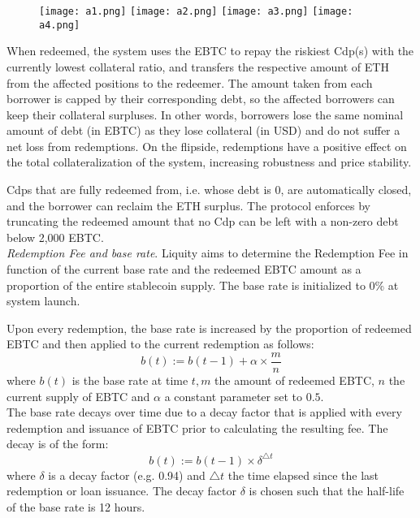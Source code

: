 \documentclass{article}
\begin{document}
\begin{figure}[h]
\centering
\texttt{[image: a1.png]}
\texttt{[image: a2.png]}
\texttt{[image: a3.png]}
\texttt{[image: a4.png]}
\end{figure}

When redeemed, the system uses the EBTC to repay the riskiest Cdp(s) with the currently lowest collateral ratio, and transfers the respective amount of ETH from the affected positions to the redeemer. The amount taken from each borrower is capped by their corresponding debt, so the affected borrowers can keep their collateral surpluses. In other words, borrowers lose the same nominal amount of debt (in EBTC) as they lose collateral (in USD) and do not suffer a net loss from redemptions. On the flipside, redemptions have a positive effect on the total collateralization of the system, increasing robustness and price stability.

Cdps that are fully redeemed from, i.e. whose debt is 0, are automatically closed, and the borrower can reclaim the ETH surplus. The protocol enforces by truncating the redeemed amount that no Cdp can be left with a non-zero debt below 2,000 EBTC. \\

\textit{Redemption Fee and base rate}. Liquity aims to determine the Redemption Fee in function of the current base rate and the redeemed EBTC amount as a proportion of the entire stablecoin supply. The base rate is initialized to 0\% at system launch.

Upon every redemption, the base rate is increased by the proportion of redeemed EBTC and then applied to the current redemption as follows:
$$b(t):=b(t-1)+\alpha\times\frac{m}{n}$$
where $b(t)$ is the base rate at time $t,m$ the amount of redeemed EBTC, $n$ the current supply of EBTC and $\alpha$ a constant parameter set to $0.5$.\\

The base rate decays over time due to a decay factor that is applied with every redemption and issuance of EBTC prior to calculating the resulting fee. The decay is of the form:
$$b(t):=b(t-1)\times\delta^{\triangle t}$$
where $\delta$ is a decay factor (e.g. 0.94) and $\triangle t$ the time elapsed since the last redemption or loan issuance. The decay factor $\delta$ is chosen such that the half-life of the base rate is 12 hours. \\
\end{document}
